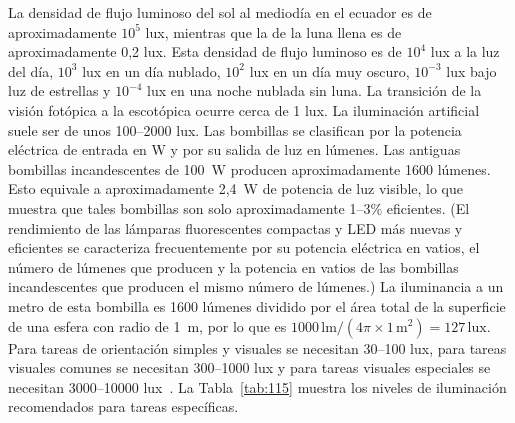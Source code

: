 \documentclass[12pt]{book}
\begin{document}
La densidad de flujo luminoso del sol al mediodía en el ecuador es de aproximadamente $10^5$ lux, mientras que la de la luna llena es de aproximadamente 0,2 lux. Esta densidad de flujo luminoso es de $10^4$ lux a la luz del día, $10^3$ lux en un día nublado, $10^2$ lux en un día muy oscuro, $10^{-3}$ lux bajo luz de estrellas y $10^{-4}$ lux en una noche nublada sin luna. La transición de la visión fotópica a la escotópica ocurre cerca de 1 lux. La iluminación artificial suele ser de unos 100--2000 lux. Las bombillas se clasifican por la potencia eléctrica de entrada en W y por su salida de luz en lúmenes. Las antiguas bombillas incandescentes de 100~W producen aproximadamente 1600 lúmenes. Esto equivale a aproximadamente 2,4~W de potencia de luz visible, lo que muestra que tales bombillas son solo aproximadamente 1--$3\%$ eficientes. (El rendimiento de las lámparas fluorescentes compactas y LED más nuevas y eficientes se caracteriza frecuentemente por su potencia eléctrica en vatios, el número de lúmenes que producen y la potencia en vatios de las bombillas incandescentes que producen el mismo número de lúmenes.) La iluminancia a un metro de esta bombilla es 1600 lúmenes dividido por el área total de la superficie de una esfera con radio de 1~m, por lo que es $1000\,\text{lm}/(4\pi \times 1\,\text{m}^2) = 127\,\text{lux}$. Para tareas de orientación simples y visuales se necesitan 30--100 lux, para tareas visuales comunes se necesitan 300--1000 lux y para tareas visuales especiales se necesitan 3000--10000 lux~\cite{47}. La Tabla~\ref{tab:115} muestra los niveles de iluminación recomendados para tareas específicas.
\end{document}
